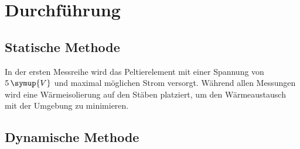 \section{Durchführung}
\label{sec:Durchführung}

\subsection{Statische Methode}
\label{sec:Statische Methode}

In der ersten Messreihe wird das Peltierelement mit einer Spannung von $5\,\symup{V}$ und maximal möglichen Strom versorgt.
Während allen Messungen wird eine Wärmeisolierung auf den Stäben platziert, um den Wärmeaustausch mit der Umgebung zu minimieren.

\subsection{Dynamische Methode}
\label{sec:Dynamische Methode}